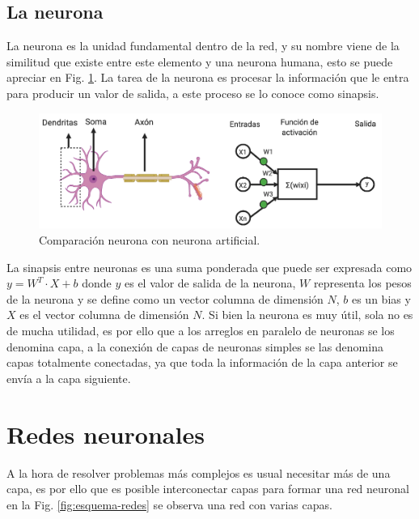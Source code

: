 \subsection{La neurona}

La neurona es la unidad fundamental dentro de la red, y su nombre viene de la similitud que existe entre este elemento y una neurona humana, esto se puede apreciar en Fig. \ref{fig:comparativa-neuronas}. La tarea de la neurona es procesar la información que le entra para producir un valor de salida, a este proceso se lo conoce como sinapsis.

\begin{figure}[h]
    \centering
    \includegraphics[width=1\textwidth]{imgs/comparacion-neurona-red.png}
    \caption{Comparación neurona con neurona artificial.}
    \label{fig:comparativa-neuronas}
\end{figure}

La sinapsis entre neuronas es una suma ponderada que puede ser expresada como $y =W^T \cdot X + b$ donde $y$ es el valor de salida de la neurona,
$W$ representa los pesos de la neurona y se define como un vector columna de dimensión $N$, $b$ es un bias y $X$ es el vector columna de dimensión $N$. Si bien la neurona es muy útil, sola no es de mucha utilidad, es por ello que a los arreglos en paralelo de neuronas se los denomina capa, a la conexión de capas de neuronas simples se las denomina capas totalmente conectadas, ya que toda la información de la capa anterior se envía a la capa siguiente.

\section{Redes neuronales}

A la hora de resolver problemas más complejos es usual necesitar más de una capa, es por ello que es posible interconectar capas para formar una red neuronal en la Fig. \ref{fig:esquema-redes} se observa una red con varias capas.

